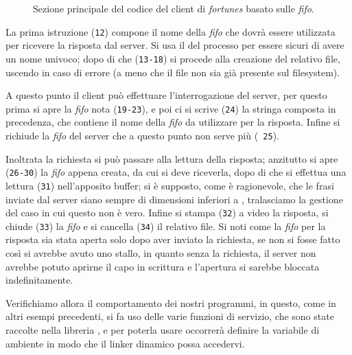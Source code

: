 \begin{figure}[!htbp]
  \footnotesize \centering
  \begin{minipage}[c]{\codesamplewidth}
  \end{minipage} 
  \normalsize 
  \caption{Sezione principale del codice del client di \textit{fortunes}
    basato sulle \textit{fifo}.}
  \label{fig:ipc_fifo_client}
\end{figure}

La prima istruzione (\texttt{\small 12}) compone il nome della \textit{fifo}
che dovrà essere utilizzata per ricevere la risposta dal server.  Si usa il
 del processo per essere sicuri di avere un nome univoco; dopo di che
(\texttt{\small 13-18}) si procede alla creazione del relativo file, uscendo
in caso di errore (a meno che il file non sia già presente sul filesystem).

A questo punto il client può effettuare l'interrogazione del server, per
questo prima si apre la \textit{fifo} nota (\texttt{\small 19-23}), e poi ci
si scrive (\texttt{\small 24}) la stringa composta in precedenza, che contiene
il nome della \textit{fifo} da utilizzare per la risposta. Infine si richiude
la \textit{fifo} del server che a questo punto non serve più (\texttt{\small
  25}). 

Inoltrata la richiesta si può passare alla lettura della risposta; anzitutto
si apre (\texttt{\small 26-30}) la \textit{fifo} appena creata, da cui si
deve riceverla, dopo di che si effettua una lettura (\texttt{\small 31})
nell'apposito buffer; si è supposto, come è ragionevole, che le frasi inviate
dal server siano sempre di dimensioni inferiori a ,
tralasciamo la gestione del caso in cui questo non è vero. Infine si stampa
(\texttt{\small 32}) a video la risposta, si chiude (\texttt{\small 33}) la
\textit{fifo} e si cancella (\texttt{\small 34}) il relativo file.  Si noti
come la \textit{fifo} per la risposta sia stata aperta solo dopo aver inviato
la richiesta, se non si fosse fatto così si avrebbe avuto uno stallo, in
quanto senza la richiesta, il server non avrebbe potuto aprirne il capo in
scrittura e l'apertura si sarebbe bloccata indefinitamente.

Verifichiamo allora il comportamento dei nostri programmi, in questo, come in
altri esempi precedenti, si fa uso delle varie funzioni di servizio, che sono
state raccolte nella libreria , e per poterla usare
occorrerà definire la variabile di ambiente  in modo
che il linker dinamico possa accedervi.

